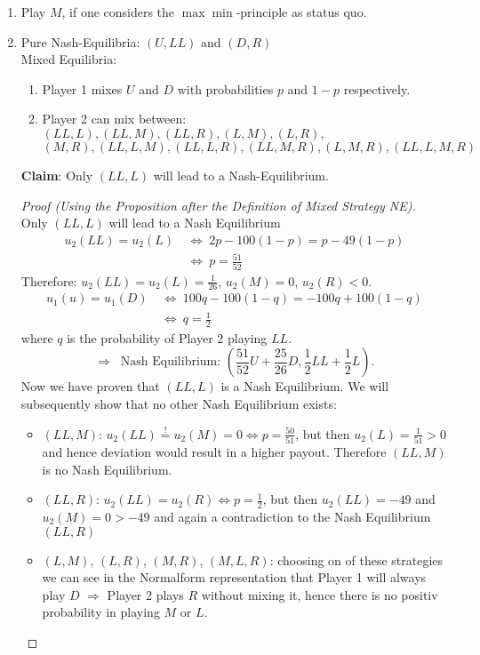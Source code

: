 \documentclass[12pt]{extreport} %
\theoremstyle{named}
\theoremstyle{itshape}
\theoremstyle{normal}
\begin{document}
\begin{enumerate}
	\item Play $M$, if one considers the $\max \min$-principle as status quo.
	\item Pure Nash-Equilibria: $(U, LL)$ and $(D, R)$ ~\\
		Mixed Equilibria: 
		\begin{enumerate}
			\item Player 1 mixes $U$ and $D$ with probabilities $p$ and $1 -p$ respectively.
			\item Player 2 can mix between: $(LL, L), (LL, M), (LL, R), (L, M), (L, R),$
				$$ (M, R), (LL, L, M), (LL, L, R), (LL, M, R), (L, M, R), (LL, L, M, R) $$
		\end{enumerate}
		\textbf{Claim}: Only $(LL, L)$ will lead to a Nash-Equilibrium.
			\begin{proof}[Proof (Using the Proposition after the Definition of Mixed Strategy NE)] ~\\
				Only $(LL, L)$ will lead to a Nash Equilibrium
				\begin{align*}
					u_{2}(LL) = u_{2}(L) ~ & \iff ~ 2p - 100 (1-p) = p - 49 (1-p) \\
					& \iff ~p = \frac{51}{52}
				\end{align*} 
				Therefore: $u_{2}(LL) = u_{2}(L) = \frac{1}{26}$, $u_{2}(M) = 0$, $u_{2}(R) < 0$.
				\begin{align*}
					u_{1}(u) = u_{1}(D)  ~ & \iff ~ 100q - 100(1-q) = -100q + 100(1-q) \\
					& \iff ~ q = \frac{1}{2}
				\end{align*} 
				where $q$ is the probability of Player 2 playing $LL$.~\\
				$$ \Rightarrow ~ \text{ Nash Equilibrium: } \left( \frac{51}{52} U + \frac{25}{26} D, \frac{1}{2} LL + \frac{1}{2} L \right). $$
				Now we have proven that $(LL, L)$ is a Nash Equilibrium. We will subsequently show that no other Nash Equilibrium exists:
				\begin{itemize}
					\item $(LL, M)$: $u_{2}(LL) \overset{!}{=} u_{2}(M) = 0 \iff p = \frac{50}{51}$, but then $u_{2}(L) = \frac{1}{51} > 0$ and hence deviation would result in a higher payout. Therefore $(LL, M)$ is no Nash Equilibrium.
					\item $(LL, R)$: $u_{2}(LL) = u_{2}(R) \iff p = \frac{1}{2}$, but then $u_{2}(LL) = - 49$ and $u_{2}(M) = 0 > - 49$ and again a contradiction to the Nash Equilibrium $(LL, R)$
					\item $(L, M)$, $(L, R)$, $(M, R)$, $(M, L, R)$: choosing on of these strategies we can see in the Normalform representation that Player 1 will always play $D$ $\Rightarrow$ Player 2 plays $R$ without mixing it, hence there is no positiv probability in playing $M$ or $L$.

\end{itemize}
\end{proof}
\end{enumerate}
\end{document}
